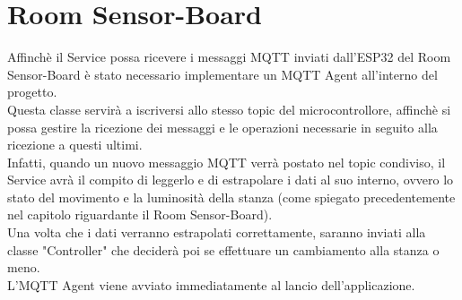 \documentclass[a4paper]{report}
\begin{document}
\section{Room Sensor-Board}
Affinchè il Service possa ricevere i messaggi MQTT inviati dall'ESP32 del Room Sensor-Board è stato necessario implementare un MQTT Agent all'interno del progetto.\\
Questa classe servirà a iscriversi allo stesso topic del microcontrollore, affinchè si possa gestire la ricezione dei messaggi e le operazioni necessarie in seguito alla ricezione a questi ultimi.\\
Infatti, quando un nuovo messaggio MQTT verrà postato nel topic condiviso, il Service avrà il compito di leggerlo e di estrapolare i dati al suo interno, ovvero lo stato del movimento e la luminosità della stanza (come spiegato precedentemente nel capitolo riguardante il Room Sensor-Board).\\
Una volta che i dati verranno estrapolati correttamente, saranno inviati alla classe "Controller" che deciderà poi se effettuare un cambiamento alla stanza o meno.\\
L'MQTT Agent viene avviato immediatamente al lancio dell'applicazione.\\
\end{document}
